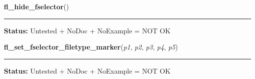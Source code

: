     \label{xformslib:library:fl_hide_fselector}

    \vspace{0.5ex}

\hspace{.8\funcindent}\begin{boxedminipage}{\funcwidth}

    \raggedright \textbf{fl\_hide\_fselector}()

    \vspace{-1.5ex}

    \rule{\textwidth}{0.5\fboxrule}
\setlength{\parskip}{2ex}
\setlength{\parskip}{1ex}
\textbf{Status:} Untested + NoDoc + NoExample = NOT OK



    \end{boxedminipage}

    \label{xformslib:library:fl_set_fselector_filetype_marker}

    \vspace{0.5ex}

\hspace{.8\funcindent}\begin{boxedminipage}{\funcwidth}

    \raggedright \textbf{fl\_set\_fselector\_filetype\_marker}(\textit{p1}, \textit{p2}, \textit{p3}, \textit{p4}, \textit{p5})

    \vspace{-1.5ex}

    \rule{\textwidth}{0.5\fboxrule}
\setlength{\parskip}{2ex}
\setlength{\parskip}{1ex}
\textbf{Status:} Untested + NoDoc + NoExample = NOT OK



    \end{boxedminipage}

    \label{xformslib:library:fl_show_fselector}

    \vspace{0.5ex}

